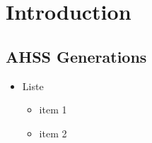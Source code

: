 \documentclass[11pt]{article}
\begin{document}
\clearpage
\section{Introduction}
\subsection{AHSS Generations}


\begin{itemize}[leftmargin=0cm,label={}]
\item Liste
\begin{itemize}
\item item 1
\item item 2
\end{itemize}
\end{itemize}
\end{document}
